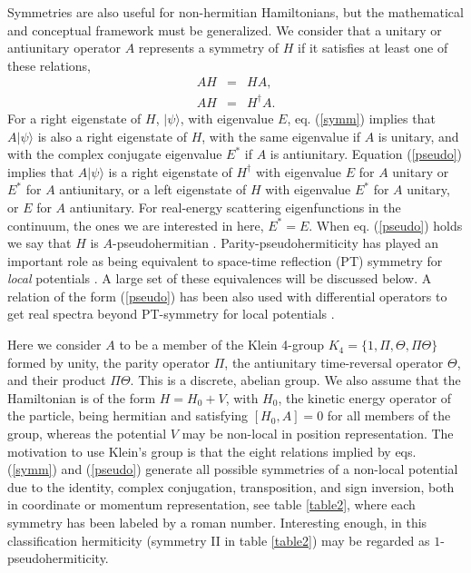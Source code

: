 Symmetries are also useful for  non-hermitian Hamiltonians, but the mathematical and conceptual
framework must be generalized. We consider that a unitary or antiunitary
%
operator $A$ represents a symmetry of $H$ if it satisfies
at least one of these relations,
%
\begin{eqnarray}
AH&=&HA,
\label{symm}
\\
AH&=&H^\dagger A.
\label{pseudo}
\end{eqnarray}
%
For a right eigenstate of $H$, $|\psi\rangle$,
with eigenvalue $E$, eq. (\ref{symm}) implies that
$A|\psi\rangle$ is also a right  eigenstate of $H$, with the
same eigenvalue if $A$ is unitary, and with the complex conjugate eigenvalue $E^*$ if $A$ is antiunitary.
Equation (\ref{pseudo}) implies that $A|\psi\rangle$ is a right eigenstate of $H^\dagger$
with eigenvalue $E$ for $A$ unitary or $E^*$ for $A$ antiunitary, or a left eigenstate of $H$ with eigenvalue $E^*$ for $A$ unitary, or $E$
for $A$ antiunitary. For real-energy scattering
eigenfunctions in the continuum, the ones we are interested in here, $E^*=E$.
When eq. (\ref{pseudo}) holds we say that $H$ is $A$-pseudohermitian \cite{Mostafazadeh2010}.
Parity-pseudohermiticity has played an important role as being equivalent to space-time reflection (PT) symmetry for {\it local} potentials
 \cite{Mostafazadeh2010,Znojil2015}. A large set of these equivalences
will be discussed below.
A relation of the form (\ref{pseudo}) has been also used with differential operators  to get real spectra beyond
PT-symmetry for local potentials  \cite{Nixon2016,Nixon2016a}.

Here we consider
$A$ to be a member of the
Klein 4-group $K_4=\{1,\Pi, \Theta, \Pi\Theta\}$ formed by unity, the parity operator $\Pi$, the antiunitary time-reversal operator $\Theta$, and their product
$\Pi\Theta$. This is a discrete, abelian group.
We also assume that the  Hamiltonian is  of the form $H=H_0+V$, with $H_0$, the kinetic energy operator of the particle,
being hermitian and
satisfying $[H_0,A]=0$ for all members of the group, whereas the potential $V$ may be non-local in position representation.
The  motivation to use Klein's group is that the eight relations implied by eqs. (\ref{symm}) and (\ref{pseudo}) generate all
possible symmetries of a non-local potential due to the identity, complex conjugation, transposition, and sign inversion,
both in coordinate or momentum representation, see table \ref{table2}, where each symmetry has been labeled by a roman number.
Interesting enough, in this classification hermiticity (symmetry II in  table \ref{table2})
may be regarded as $1$-pseudohermiticity.

